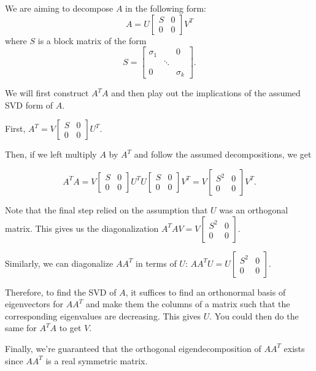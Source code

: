 \documentclass{ximera}
\begin{document}
\begin{remark}

We are aiming to decompose $A$ in the following form:
\begin{equation*}
A=U\left[
\begin{array}{cc}
S & 0 \\
0 & 0
\end{array}
\right] V^T
\end{equation*}
where $S $ is a block matrix of the form
\[
S =\left[
\begin{array}{ccc}
\sigma_{1} &  & 0 \\
& \ddots &  \\
0 &  & \sigma_{k}
\end{array}
\right].
\]

We will first construct $A^TA$ and then play out the implications of the assumed SVD form of $A$.

First,  $A^T=V\left[
\begin{array}{cc}
S & 0 \\
0 & 0
\end{array}
\right] U^T.$ 

Then, if we left multiply $A$ by $A^T$ and follow the assumed decompositions, we get

\begin{equation*}
A^TA=V\left[
\begin{array}{cc}
S & 0 \\
0 & 0
\end{array}
\right] U^TU\left[
\begin{array}{cc}
S & 0 \\
0 & 0
\end{array}
\right] V^T=V\left[
\begin{array}{cc}
S ^{2} & 0 \\
0 & 0
\end{array}
\right] V^T.
\end{equation*}

Note that the final step relied on the assumption that $U$ was an orthogonal matrix. This gives us the diagonalization $A^TAV=V\left[
\begin{array}{cc}
S ^{2} & 0 \\
0 & 0
\end{array}
\right] .$ 

Similarly, we can diagonalize $AA^T$ in terms of $U$: $AA^TU=U\left[
\begin{array}{cc}
S ^{2} & 0 \\
0 & 0
\end{array}
\right] .$ 

Therefore, to find the SVD of $A$, it suffices to find an orthonormal basis of eigenvectors
for $AA^T$ and make them the columns of a matrix such that the
corresponding eigenvalues are decreasing. This gives $U.$ You could then do
the same for $A^TA$ to get $V$.

Finally, we're guaranteed that the orthogonal eigendecomposition of $AA^T$ exists since $AA^T$ is a real symmetric matrix. 

\end{remark}
 
\end{document}
